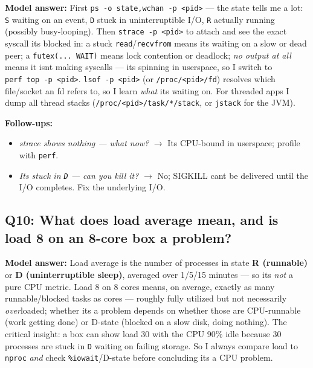 \documentclass[11pt]{article}
\providecommand{\tightlist}{\setlength{\itemsep}{1pt}\setlength{\parskip}{0pt}}
\begin{document}
\textbf{Model answer:} First \texttt{ps\ -o\ state,wchan\ -p\ \textless{}pid\textgreater{}} --- the state tells me a lot: \texttt{S} waiting on an event, \texttt{D} stuck in uninterruptible I/O, \texttt{R} actually running (possibly busy-looping). Then \texttt{strace\ -p\ \textless{}pid\textgreater{}} to attach and see the exact syscall it\textquotesingle s blocked in: a stuck \texttt{read}/\texttt{recvfrom} means it\textquotesingle s waiting on a slow or dead peer; a \texttt{futex(...\ WAIT)} means lock contention or deadlock; \emph{no output at all} means it isn\textquotesingle t making syscalls --- it\textquotesingle s spinning in userspace, so I switch to \texttt{perf\ top\ -p\ \textless{}pid\textgreater{}}. \texttt{lsof\ -p\ \textless{}pid\textgreater{}} (or \texttt{/proc/\textless{}pid\textgreater{}/fd}) resolves which file/socket an fd refers to, so I learn \emph{what} it\textquotesingle s waiting on. For threaded apps I dump all thread stacks (\texttt{/proc/\textless{}pid\textgreater{}/task/*/stack}, or \texttt{jstack} for the JVM).

\textbf{Follow-ups:}

\begin{itemize}
\tightlist
\item
  \emph{strace shows nothing --- what now?} \(\rightarrow\) It\textquotesingle s CPU-bound in userspace; profile with \texttt{perf}.
\item
  \emph{It\textquotesingle s stuck in \texttt{D} --- can you kill it?} \(\rightarrow\) No; SIGKILL can\textquotesingle t be delivered until the I/O completes. Fix the underlying I/O.
\end{itemize}

\subsection{Q10: What does load average mean, and is load 8 on an 8-core box a problem?}\label{q10-what-does-load-average-mean-and-is-load-8-on-an-8-core-box-a-problem}

\textbf{Model answer:} Load average is the number of processes in state \textbf{R (runnable)} or \textbf{D (uninterruptible sleep)}, averaged over 1/5/15 minutes --- so it\textquotesingle s \emph{not} a pure CPU metric. Load 8 on 8 cores means, on average, exactly as many runnable/blocked tasks as cores --- roughly fully utilized but not necessarily \emph{over}loaded; whether it\textquotesingle s a problem depends on whether those are CPU-runnable (work getting done) or D-state (blocked on a slow disk, doing nothing). The critical insight: a box can show load 30 with the CPU 90\% idle because 30 processes are stuck in \texttt{D} waiting on failing storage. So I always compare load to \texttt{nproc} \emph{and} check \texttt{\%iowait}/D-state before concluding it\textquotesingle s a CPU problem.
\end{document}
